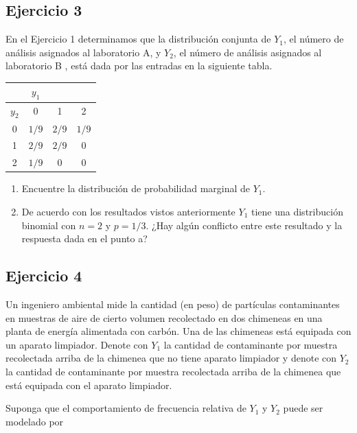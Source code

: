\documentclass[
]{article}
\begin{document}
\subsection{Ejercicio 3}\label{ejercicio-3}

En el Ejercicio 1 determinamos que la distribución conjunta de \(Y_{1}\), el número de análisis asignados al laboratorio A, y \(Y_{2}\), el número de análisis asignados al laboratorio B , está dada por las entradas en la siguiente tabla.

\begin{longtable}[]{@{}cccc@{}}
\toprule\noalign{}
& \(y_{1}\) & & \\
\midrule\noalign{}
\endhead
\bottomrule\noalign{}
\endlastfoot
\(y_{2}\) & 0 & 1 & 2 \\
0 & \(1 / 9\) & \(2 / 9\) & \(1 / 9\) \\
1 & \(2 / 9\) & \(2 / 9\) & 0 \\
2 & \(1 / 9\) & 0 & 0 \\
\end{longtable}

\begin{enumerate}
\def\labelenumi{\alph{enumi}.}
\item
  Encuentre la distribución de probabilidad marginal de \(Y_{1}\).
\item
  De acuerdo con los resultados vistos anteriormente \(Y_{1}\) tiene una distribución binomial con \(n=2\) y \(p=1 / 3\). ¿Hay algún conflicto entre este resultado y la respuesta dada en el punto a?
\end{enumerate}

\subsection{Ejercicio 4}\label{ejercicio-4}

Un ingeniero ambiental mide la cantidad (en peso) de partículas contaminantes en muestras de aire de cierto volumen recolectado en dos chimeneas en una planta de energía alimentada con carbón. Una de las chimeneas está equipada con un aparato limpiador. Denote con \(Y_{1}\) la cantidad de contaminante por muestra recolectada arriba de la chimenea que no tiene aparato limpiador y denote con \(Y_{2}\) la cantidad de contaminante por muestra recolectada arriba de la chimenea que está equipada con el aparato limpiador.

Suponga que el comportamiento de frecuencia relativa de \(Y_{1}\) y \(Y_{2}\) puede ser modelado por
\end{document}
